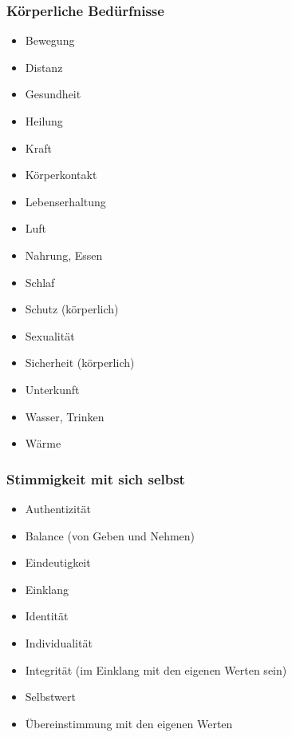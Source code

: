 \subsubsection{Körperliche Bedürfnisse}

\begin{multicols}{2}
  \begin{itemize}
    \item Bewegung
    \item Distanz
    \item Gesundheit
    \item Heilung
    \item Kraft
    \item Körperkontakt
    \item Lebenserhaltung
    \item Luft
    \item Nahrung, Essen
    \item Schlaf
    \item Schutz (körperlich)
    \item Sexualität
    \item Sicherheit (körperlich)
    \item Unterkunft
    \item Wasser, Trinken
    \item Wärme
  \end{itemize}
\end{multicols}


\subsubsection{Stimmigkeit mit sich selbst}

\begin{multicols}{2}
  \begin{itemize}
    \item Authentizität
    \item Balance (von Geben und Nehmen)
    \item Eindeutigkeit
    \item Einklang
    \item Identität
    \item Individualität
    \item Integrität (im Einklang mit den eigenen Werten sein)
    \item Selbstwert
    \item Übereinstimmung mit den eigenen Werten
  \end{itemize}
\end{multicols}


